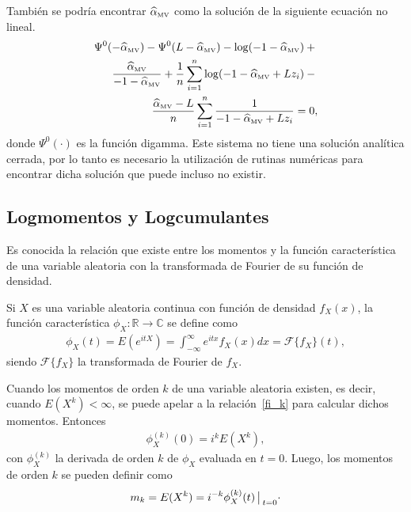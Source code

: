 También se podría encontrar $\widehat{\alpha}_{{\text{\tiny{MV}}}}$ como la solución de la siguiente ecuación no lineal.
\begin{align}
\label{rootML}
\Psi^0(-\widehat{\alpha}_{{\text{\tiny{MV}}}})-\Psi^0(L-\widehat{\alpha}_{{\text{\tiny{MV}}}})-\log(-1-\widehat{\alpha}_{{\text{\tiny{MV}}}})+{} \nonumber\\
\frac{\widehat{\alpha}_{{\text{\tiny{MV}}}}}{-1-\widehat{\alpha}_{{\text{\tiny{MV}}}}}+
\frac{1}{n}\sum_{i=1}^n{\log(-1-\widehat{\alpha}_{{\text{\tiny{MV}}}}+Lz_i)}-{}
\nonumber
\\ \frac{\widehat{\alpha}_{{\text{\tiny{MV}}}}-L}{n}\sum_{i=1}^n \frac1{-1-\widehat{\alpha}_{{\text{\tiny{MV}}}}+Lz_i}= 0, 
\end{align}
donde $\Psi^0(\cdot)$ es la función digamma. Este sistema no tiene una solución analítica cerrada, por lo tanto es necesario la utilización de rutinas numéricas para encontrar dicha solución que puede incluso no existir.

\subsection{Logmomentos y Logcumulantes}
\label{MetodoLC}

Es conocida la relación que existe entre los momentos y la función característica de una variable aleatoria con la transformada de Fourier de su función de densidad. 

\begin{definition}
Si $X$ es una variable aleatoria continua con función de densidad $f_X(x)$, la función característica $\phi_X: \mathbb{R} \rightarrow \mathbb{C}$ se define como 
\begin{align}
\phi_X(t)=E(e^{itX})=\int_{-\infty}^{\infty} e^{itx} f_X(x) dx = \mathcal{F}\{f_X\}(t),
\label{fi_caracteristica}
\end{align}
siendo $\mathcal{F}\{f_X\}$ la transformada de Fourier de $f_X$.
\end{definition}

Cuando los momentos de orden $k$ de una variable aleatoria existen, es decir, cuando $E(X^k)< \infty$, se puede apelar a la relación~\eqref{fi_k} para calcular dichos momentos. Entonces
\begin{align}
\phi_X^{(k)}(0)=i^k E(X^k),
\label{fi_k}
\end{align}
con $\phi_X^{(k)}$ la derivada de orden $k$ de $\phi_X$ evaluada en $t=0$. Luego, los momentos de orden $k$ se pueden definir como 
\begin{align}
\label{MomentosPrimerTipo}
m_k=E(X^k)=i^{-k} \phi_X^{(k)}(t)\big\arrowvert _{t=0}\cdot
\end{align}

